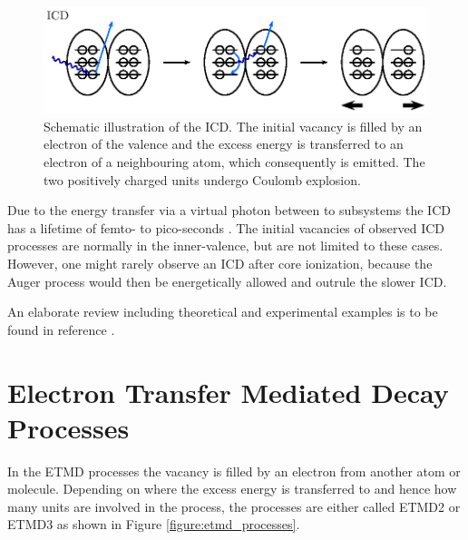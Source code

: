 \begin{figure}[h]
 \centering
 \includegraphics{pics/icd-pspic.eps}
 \caption{Schematic illustration of the \ac{ICD}. The initial vacancy is filled
          by an electron of the valence and the excess energy is transferred to
          an electron of a neighbouring atom, which consequently is emitted.
          The two positively charged units undergo Coulomb explosion.}
 \label{figure:icd_process}
\end{figure}


Due to the energy transfer via a virtual photon between to subsystems
the ICD has a lifetime of femto- to pico-seconds \cite{Zobeley98,Santra01_1,
Zobeley01,Santra01_3,Averbukh04,Averbukh05}.
The initial vacancies of observed ICD processes are normally in the inner-valence,
but are not limited to these cases. However, one might rarely observe
an ICD after core ionization, because the Auger process would then be energetically
allowed and outrule the slower ICD.

An elaborate review including theoretical and experimental examples is to be
found in reference \cite{Hergenhahn11}.


\section{Electron Transfer Mediated Decay Processes}
In the \ac{ETMD} processes the vacancy is filled by an electron from another
atom or molecule. Depending on where
the excess energy is transferred to and
hence how many units are involved in the process, the processes are either called
ETMD2 or ETMD3 as shown in Figure \ref{figure:etmd_processes}.

